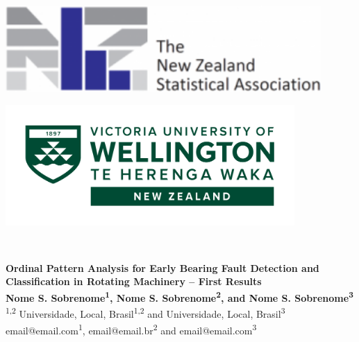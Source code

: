 \documentclass[a0,portrait]{a0poster}
\begin{document}
\begin{mdframed}[style=MyFrame]

\begin{minipage}[b]{0.33\linewidth}
\raggedright
\includegraphics[width=12cm,valign=t]{NZSA-logo-words-e1505785105112-1.png}
\end{minipage}
%
\begin{minipage}[b]{0.33\linewidth}
\centering
\hfill
\end{minipage}
\begin{minipage}[b]{0.33\linewidth}
\raggedleft
\includegraphics[width=11cm,valign=t]{"Logo Offshore Standard Landscape Reversed RGB.png"}
\end{minipage}\\

\vspace{3cm}
\begin{minipage}[h]{0.98\linewidth}
\centering \huge \color{SteelBlue} \textbf{Ordinal Pattern Analysis for Early Bearing Fault Detection and Classification in Rotating Machinery -- First Results} \color{Black}\\ %
\Large \textbf{Nome S. Sobrenome\textsuperscript{1}, Nome S. Sobrenome\textsuperscript{2}, and Nome S. Sobrenome\textsuperscript{3}}\\ %
\normalsize \textsuperscript{1,2} Universidade, Local, Brasil\textsuperscript{1,2} and Universidade, Local, Brasil\textsuperscript{3}\\ %
email@email.com\textsuperscript{1}, email@email.br\textsuperscript{2} and email@email.com\textsuperscript{3}\\
\end{minipage}
\vspace{0.5cm} %


\end{mdframed}
\end{document}
